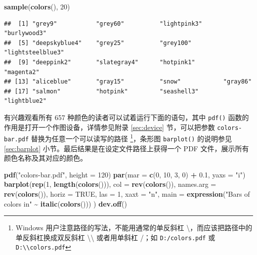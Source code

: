 \documentclass[
  b5paper,
  UTF8,twoside]{book}
\newenvironment{Shaded}{\begin{snugshade}}{\end{snugshade}}
\newcommand{\AttributeTok}[1]{\textcolor[rgb]{0.13,0.29,0.53}{#1}}
\newcommand{\ConstantTok}[1]{\textcolor[rgb]{0.56,0.35,0.01}{#1}}
\newcommand{\DecValTok}[1]{\textcolor[rgb]{0.00,0.00,0.81}{#1}}
\newcommand{\FloatTok}[1]{\textcolor[rgb]{0.00,0.00,0.81}{#1}}
\newcommand{\FunctionTok}[1]{\textcolor[rgb]{0.13,0.29,0.53}{\textbf{#1}}}
\newcommand{\NormalTok}[1]{#1}
\newcommand{\SpecialCharTok}[1]{\textcolor[rgb]{0.81,0.36,0.00}{\textbf{#1}}}
\newcommand{\StringTok}[1]{\textcolor[rgb]{0.31,0.60,0.02}{#1}}
\begin{document}
\begin{Shaded}
\begin{Highlighting}[]
\FunctionTok{sample}\NormalTok{(}\FunctionTok{colors}\NormalTok{(), }\DecValTok{20}\NormalTok{)}
\end{Highlighting}
\end{Shaded}

\begin{verbatim}
##  [1] "grey9"           "grey60"          "lightpink3"      "burlywood3"     
##  [5] "deepskyblue4"    "grey25"          "grey100"         "lightsteelblue3"
##  [9] "deeppink2"       "slategray4"      "hotpink1"        "magenta2"       
## [13] "aliceblue"       "gray15"          "snow"            "gray86"         
## [17] "salmon"          "hotpink"         "seashell3"       "lightblue2"
\end{verbatim}

有兴趣观看所有 657 种颜色的读者可以试着运行下面的语句，其中 \texttt{pdf()} 函数的作用是打开一个作图设备，详情参见附录 \ref{sec:device} 节，可以把参数 \texttt{\textquotesingle{}colors-bar.pdf\textquotesingle{}} 替换为任意一个可以读写的路径 \footnote{Windows 用户注意路径的写法，不能用通常的单反斜杠 \textbackslash，而应该把路径中的单反斜杠换成双反斜杠 \textbackslash\textbackslash{} 或者用单斜杠 /；如 \texttt{D:/colors.pdf} 或 \texttt{D:\textbackslash{}\textbackslash{}colors.pdf}}，条形图 \texttt{barplot()} 的说明参见 \ref{sec:barplot} 小节。最后结果是在设定文件路径上获得一个 PDF 文件，展示所有颜色名称及其对应的颜色。

\begin{Shaded}
\begin{Highlighting}[]
\FunctionTok{pdf}\NormalTok{(}\StringTok{"colors{-}bar.pdf"}\NormalTok{, }\AttributeTok{height =} \DecValTok{120}\NormalTok{)}
\FunctionTok{par}\NormalTok{(}\AttributeTok{mar =} \FunctionTok{c}\NormalTok{(}\DecValTok{0}\NormalTok{, }\DecValTok{10}\NormalTok{, }\DecValTok{3}\NormalTok{, }\DecValTok{0}\NormalTok{) }\SpecialCharTok{+} \FloatTok{0.1}\NormalTok{, }\AttributeTok{yaxs =} \StringTok{"i"}\NormalTok{)}
\FunctionTok{barplot}\NormalTok{(}\FunctionTok{rep}\NormalTok{(}\DecValTok{1}\NormalTok{, }\FunctionTok{length}\NormalTok{(}\FunctionTok{colors}\NormalTok{())),}
  \AttributeTok{col =} \FunctionTok{rev}\NormalTok{(}\FunctionTok{colors}\NormalTok{()), }\AttributeTok{names.arg =} \FunctionTok{rev}\NormalTok{(}\FunctionTok{colors}\NormalTok{()), }\AttributeTok{horiz =} \ConstantTok{TRUE}\NormalTok{,}
  \AttributeTok{las =} \DecValTok{1}\NormalTok{, }\AttributeTok{xaxt =} \StringTok{"n"}\NormalTok{, }\AttributeTok{main =} \FunctionTok{expression}\NormalTok{(}\StringTok{"Bars of colors in"} \SpecialCharTok{\textasciitilde{}} \FunctionTok{italic}\NormalTok{(}\FunctionTok{colors}\NormalTok{()))}
\NormalTok{)}
\FunctionTok{dev.off}\NormalTok{()}
\end{Highlighting}
\end{Shaded}
\end{document}
